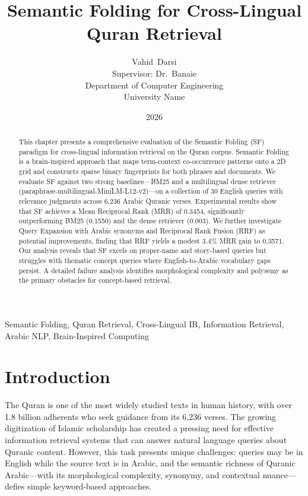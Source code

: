 \documentclass[conference]{IEEEtran}
\title{Semantic Folding for Cross-Lingual Quran Retrieval}
\author{
  Vahid~Darsi \\
  Supervisor: Dr.~Banaie \\
  Department of Computer Engineering \\
  University Name
}
\date{2026}
\begin{document}
\maketitle

\begin{abstract}
This chapter presents a comprehensive evaluation of the Semantic Folding
(SF) paradigm for cross-lingual information retrieval on the Quran corpus.
Semantic Folding is a brain-inspired approach that maps term-context
co-occurrence patterns onto a 2D grid and constructs sparse binary
fingerprints for both phrases and documents. We evaluate SF against two
strong baselines---BM25 and a multilingual dense retriever
(paraphrase-multilingual-MiniLM-L12-v2)---on a collection of 30 English
queries with relevance judgments across 6,236 Arabic Quranic verses.
Experimental results show that SF achieves a Mean Reciprocal Rank (MRR)
of 0.3454, significantly outperforming BM25 (0.1550) and the dense
retriever (0.003). We further investigate Query Expansion with Arabic
synonyms and Reciprocal Rank Fusion (RRF) as potential improvements,
finding that RRF yields a modest 3.4\% MRR gain to 0.3571. Our analysis
reveals that SF excels on proper-name and story-based queries but
struggles with thematic concept queries where English-to-Arabic
vocabulary gaps persist. A detailed failure analysis identifies
morphological complexity and polysemy as the primary obstacles for
concept-based retrieval.
\end{abstract}

\begin{IEEEkeywords}
Semantic Folding, Quran Retrieval, Cross-Lingual IR, Information
Retrieval, Arabic NLP, Brain-Inspired Computing
\end{IEEEkeywords}

\section{Introduction}

The Quran is one of the most widely studied texts in human history,
with over 1.8 billion adherents who seek guidance from its 6,236 verses.
The growing digitization of Islamic scholarship has created a pressing
need for effective information retrieval systems that can answer natural
language queries about Quranic content. However, this task presents
unique challenges: queries may be in English while the source text is
in Arabic, and the semantic richness of Quranic Arabic---with its
morphological complexity, synonymy, and contextual nuance---defies
simple keyword-based approaches.
\end{document}
